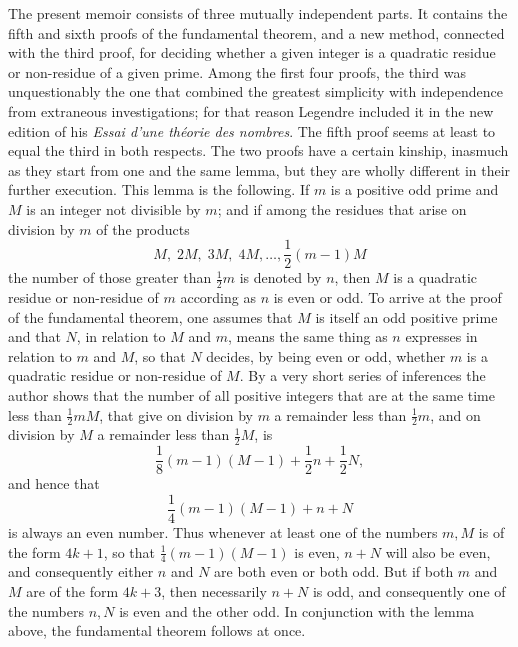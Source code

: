 \documentclass[12pt]{article}
\begin{document}
The present memoir consists of three mutually independent parts. It contains the fifth and sixth proofs of the fundamental theorem, and a new method, connected with the third proof, for deciding whether a given integer is a quadratic residue or non-residue of a given prime. Among the first four proofs, the third was unquestionably the one that combined the greatest simplicity with independence from extraneous investigations; for that reason Legendre included it in the new edition of his \textit{Essai d'une théorie des nombres}. The fifth proof seems at least to equal the third in both respects. The two proofs have a certain kinship, inasmuch as they start from one and the same lemma, but they are wholly different in their further execution. This lemma is the following. If $m$ is a positive odd prime and $M$ is an integer not divisible by $m$; and if among the residues that arise on division by $m$ of the products
\[
M,\;2M,\;3M,\;4M,\ldots,\frac12(m-1)M
\]
the number of those greater than $\frac12m$ is denoted by $n$, then $M$ is a quadratic residue or non-residue of $m$ according as $n$ is even or odd. To arrive at the proof of the fundamental theorem, one assumes that $M$ is itself an odd positive prime and that $N$, in relation to $M$ and $m$, means the same thing as $n$ expresses in relation to $m$ and $M$, so that $N$ decides, by being even or odd, whether $m$ is a quadratic residue or non-residue of $M$. By a very short series of inferences the author shows that the number of all positive integers that are at the same time less than $\frac12mM$, that give on division by $m$ a remainder less than $\frac12m$, and on division by $M$ a remainder less than $\frac12M$, is
\[
\frac18(m-1)(M-1)+\frac12n+\frac12N,
\]
and hence that
\[
\frac14(m-1)(M-1)+n+N
\]
is always an even number. Thus whenever at least one of the numbers $m,M$ is of the form $4k+1$, so that $\frac14(m-1)(M-1)$ is even, $n+N$ will also be even, and consequently either $n$ and $N$ are both even or both odd. But if both $m$ and $M$ are of the form $4k+3$, then necessarily $n+N$ is odd, and consequently one of the numbers $n,N$ is even and the other odd. In conjunction with the lemma above, the fundamental theorem follows at once.
\end{document}
